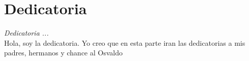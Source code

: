 \chapter*{Dedicatoria}
\begin{flushright}
  \emph{Dedicatoria ...} \\
  Hola, soy la dedicatoria.
  Yo creo que en esta parte iran las dedicatorias a mis padres, hermanos y chance al Osvaldo
\end{flushright}
\thispagestyle{empty}
